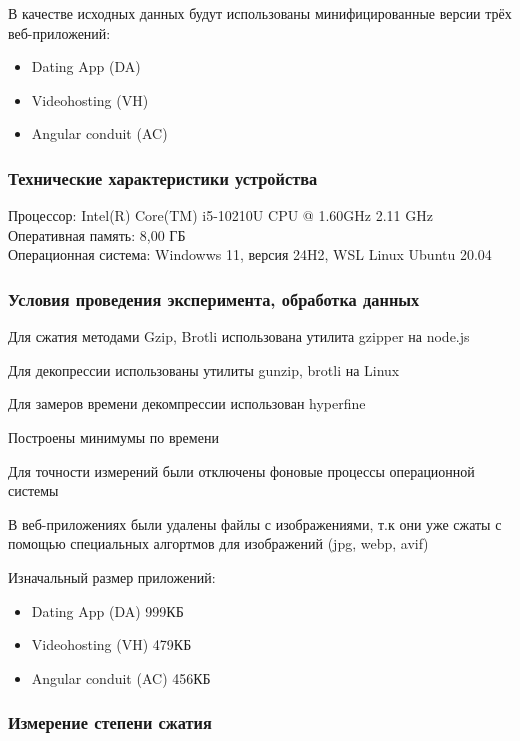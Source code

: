 \documentclass[12pt]{article}
\begin{document}
В качестве исходных данных будут использованы минифицированные версии трёх веб-приложений:

\begin{itemize}[label=-]
    \item Dating App (DA)
    \item Videohosting (VH)
    \item Angular conduit (AC)
\end{itemize}

\subsubsection{Технические характеристики устройства}

Процессор: Intel(R) Core(TM) i5-10210U CPU @ 1.60GHz 2.11 GHz\\
Оперативная память: 8,00 ГБ\\
Операционная система: Windowws 11, версия 24H2, WSL Linux Ubuntu 20.04

\subsubsection{Условия проведения эксперимента, обработка данных}

Для сжатия методами Gzip, Brotli использована утилита gzipper на node.js

Для декопрессии использованы утилиты gunzip, brotli на Linux

Для замеров времени декомпрессии использован hyperfine

Построены минимумы по времени

Для точности измерений были отключены фоновые процессы операционной системы

В веб-приложениях были удалены файлы с изображениями, т.к они уже сжаты с помощью специальных алгортмов для изображений (jpg, webp, avif)

Изначальный размер приложений:

\begin{itemize}
    \item Dating App (DA) 999КБ
    \item Videohosting (VH) 479КБ
    \item Angular conduit (AC) 456КБ
\end{itemize}

\subsubsection{Измерение степени сжатия}
\end{document}

